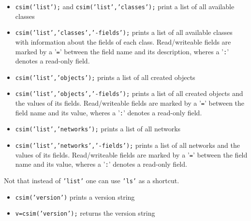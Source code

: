 
\begin{itemize}
  
\item \texttt{csim('list');} and \texttt{csim('list','classes');}
  print a list of all available classes
  
\item \texttt{csim('list','classes','-fields');} prints a list of all
  available classes with information about the fields of each class.
  Read/writeable fields are marked by a '\texttt{=}' between the field
  name and its description, wheres a '\texttt{:}' denotes a read-only
  field.

\item \texttt{csim('list','objects');}  prints a list of all created
  objects

\item \texttt{csim('list','objects','-fields');} prints a list of all
  created objects and the values of its fields. Read/writeable fields
  are marked by a '\texttt{=}' between the field name and its value,
  wheres a '\texttt{:}' denotes a read-only field.

\item \texttt{csim('list','networks');}  prints a list of all networks

\item \texttt{csim('list','networks','-fields');} prints a list of all
  networks and the values of its fields. Read/writeable fields
  are marked by a '\texttt{=}' between the field name and its value,
  wheres a '\texttt{:}' denotes a read-only field.

\end{itemize}

Not that instead of \texttt{'list'} one can use \texttt{'ls'} as a
shortcut.


\begin{itemize}
\item \texttt{csim('version')} prints a version string
\item \texttt{v=csim('version');} returns the version string
\end{itemize}

